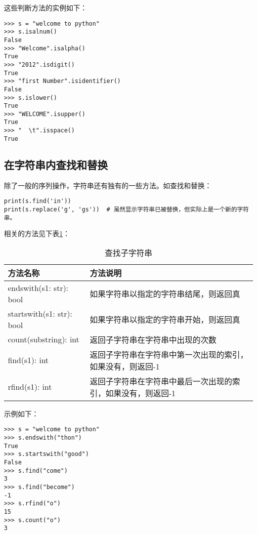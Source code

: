 这些判断方法的实例如下：

\begin{lstlisting}
>>> s = "welcome to python"
>>> s.isalnum()
False
>>> "Welcome".isalpha()
True
>>> "2012".isdigit()
True
>>> "first Number".isidentifier()
False
>>> s.islower()
True
>>> "WELCOME".isupper()
True
>>> "  \t".isspace()
True
\end{lstlisting}

\subsection{在字符串内查找和替换}

除了一般的序列操作，字符串还有独有的一些方法。如查找和替换：

\begin{lstlisting}
print(s.find('in'))
print(s.replace('g', 'gs'))  # 虽然显示字符串已被替换，但实际上是一个新的字符串。
\end{lstlisting}

相关的方法见下表\ref{tab:查找子字符串}：

\begin{table}[ht]
  \centering
  \caption{查找子字符串}
    \begin{tabularx}{\linewidth}{p{6cm}|X}
    \toprule
    \textbf{方法名称} & \textbf{方法说明} \\
    \midrule
    endswith(s1: str): bool 	& 如果字符串以指定的字符串结尾，则返回真 \\
    startswith(s1: str): bool & 如果字符串以指定的字符串开始，则返回真 \\
    count(substring): int 		& 返回子字符串在字符串中出现的次数 \\
    find(s1): int 						& 返回子字符串在字符串中第一次出现的索引，如果没有，则返回-1 \\
    rfind(s1): int 						& 返回子字符串在字符串中最后一次出现的索引，如果没有，则返回-1 \\
    \bottomrule
    \end{tabularx}%
  \label{tab:查找子字符串}%
\end{table}%

示例如下：

\begin{lstlisting}
>>> s = "welcome to python"
>>> s.endswith("thon")
True
>>> s.startswith("good")
False
>>> s.find("come")
3
>>> s.find("become")
-1
>>> s.rfind("o")
15
>>> s.count("o")
3
\end{lstlisting}


